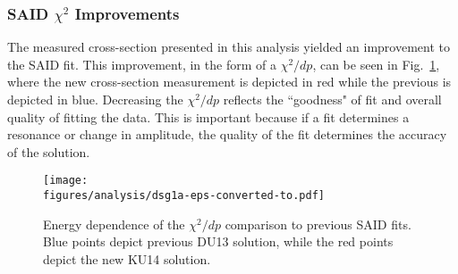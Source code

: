 \FloatBarrier
\subsubsection{SAID $\chi^2$ Improvements}\label{sec:chi}
The measured cross-section presented in this analysis yielded an improvement to the SAID fit. This improvement, in the form of a $\chi^2/dp$, can be seen in Fig.~\ref{fig:chi_sq}, where the new cross-section measurement is depicted in red while the previous is depicted in blue. Decreasing the $\chi^2/dp$ reflects the ``goodness" of fit and overall quality of fitting the data. This is important because if a fit determines a resonance or change in amplitude, the quality of the fit determines the accuracy of the solution.  
\begin{figure}[h!]\begin{center}
\texttt{[image: \\figures/analysis/dsg1a-eps-converted-to.pdf]}
\caption[Energy dependence of the $\chi^2/dp$ comparison to previous SAID fits]{\label{fig:chi_sq}Energy dependence of the $\chi^2/dp$ comparison to previous SAID fits. Blue points depict previous DU13 solution, while the red points depict the new KU14 solution.}
\end{center}\end{figure} 
\FloatBarrier
%
%
